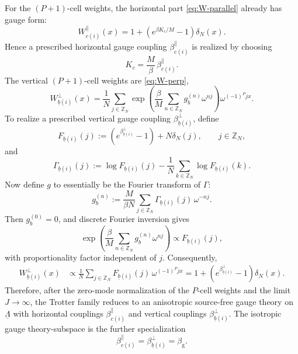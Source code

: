\documentclass[dvipsnames,a4paper]{article}
\numberwithin{equation}{section}
\theoremstyle{definition}
\theoremstyle{remark}
\begin{document}
For the \((P+1)\)-cell weights, the horizontal part \eqref{eq:W-parallel}
already has gauge form:
\begin{equation}
	W_{c(i)}^{\parallel}(x)
	=
	1+\left(e^{\beta K_c/M}-1\right)\delta_N(x).
\end{equation}
Hence a prescribed horizontal gauge coupling
\(\beta_{c(i)}^{\parallel}\) is realized by choosing
\begin{equation}
	K_c=\frac{M}{\beta}\,\beta_{c(i)}^{\parallel}.
	\label{eq:K-choice}
\end{equation}
The vertical \((P+1)\)-cell weights are \eqref{eq:W-perp},
\begin{equation}
	W_{\underline b(i)}^{\perp}(x)
	=
	\frac1N
	\sum_{j\in\mathbb Z_N}
	\exp\left(
	\frac{\beta}{M}\sum_{n\in\mathbb Z_N}g_b^{(n)}\omega^{nj}
	\right)
	\omega^{(-1)^P jx}.
\end{equation}
To realize a prescribed vertical gauge coupling
\(\beta_{\underline b(i)}^{\perp}\), define
\begin{equation}
	F_{\underline b(i)}(j)
	:=
	\left(e^{\beta_{\underline b(i)}^{\perp}}-1\right)+N\delta_N(j),
	\qquad
	j\in\mathbb Z_N,
\end{equation}
and
\begin{equation}
	\Gamma_{\underline b(i)}(j)
	:=
	\log F_{\underline b(i)}(j)
	-
	\frac1N\sum_{k\in\mathbb Z_N}\log F_{\underline b(i)}(k).
	\label{eq:Gamma-def}
\end{equation}
Now define $g$ to essentially be the Fourier transform of $\Gamma$:
\begin{equation}
	g_b^{(n)}
	:=
	\frac{M}{\beta N}
	\sum_{j\in\mathbb Z_N}
	\Gamma_{\underline b(i)}(j)\,\omega^{-nj}.
	\label{eq:g-choice}
\end{equation}
Then \(g_b^{(0)}=0\), and discrete Fourier inversion gives
\begin{equation}
	\exp\left(
	\frac{\beta}{M}\sum_{n\in\mathbb Z_N}g_b^{(n)}\omega^{nj}
	\right)
	\propto
	F_{\underline b(i)}(j),
\end{equation}
with proportionality factor independent of \(j\). Consequently,
\begin{align}
	W_{\underline b(i)}^{\perp}(x)
	&\propto
	\frac1N
	\sum_{j\in\mathbb Z_N}
	F_{\underline b(i)}(j)\,\omega^{(-1)^P jx}
	=
	1+\left(e^{\beta_{\underline b(i)}^{\perp}}-1\right)\delta_N(x).
	\label{eq:Wperp-gauge-form}
\end{align}
Therefore, after the zero-mode normalization of the \(P\)-cell weights and the
limit \(J\to\infty\), the Trotter family reduces to an anisotropic source-free
gauge theory on \(\underline\Lambda\) with horizontal couplings
\(\beta_{c(i)}^{\parallel}\) and vertical couplings
\(\beta_{\underline b(i)}^{\perp}\). The isotropic gauge theory-subspace is the further
specialization
\begin{equation}
	\beta_{c(i)}^{\parallel}
	=
	\beta_{\underline b(i)}^{\perp}
	=
	\beta_{\mathrm g}.
	\label{eq:isotropic-gauge}
\end{equation}
\end{document}
